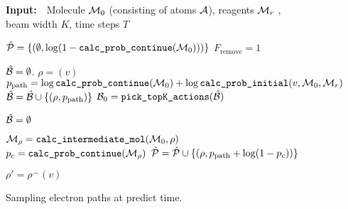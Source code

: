 

\newcommand{\cProbCont}{\texttt{calc\_prob\_continue}}
\newcommand{\cProbAct}{\texttt{calc\_prob\_action}}
\newcommand{\cProbInitial}{\texttt{calc\_prob\_initial}}
\newcommand{\removeFlag}{F_\textrm{remove}}

\newcommand{\outputPool}{\hat{\Pc}}
\newcommand{\cPath}{\rho}
\newcommand{\lProb}{p_{\textrm{path}}}


\begin{figure}
\begin{minipage}{1.\textwidth}
\begin{algorithm}[H]
  \caption{Sampling electron paths at predict time.}
  {\bf Input:}~~Molecule ${\mathcal{M}}_0$ (consisting of atoms ${\mathcal{A}}$), reagents ${\mathcal{M}}_r$ , beam width $K$, time steps $T$
  
  \begin{algorithmic}[1]
  	\STATE $\outputPool = \{\left( \emptyset, \log (1 - \cProbCont(\Mc_0)) \right) \}$  
  	\STATE $\removeFlag \!=\!1$ 
  	
  	\STATE
	\STATE $\hat{{\mathcal{B}}} = \emptyset$.  	
		\STATE $ \cPath = (v)$
		\STATE $ \lProb = \log \cProbCont(\Mc_0) + \log \cProbInitial(v, \moleculeSet_0, \moleculeSet_r)$
		\STATE $\hat{\Bc} = \hat{\Bc} \cup \{\left(\cPath, \lProb \right)\}$
	\ENDFOR
	\STATE  ${\mathcal{B}}_{0} = \texttt{pick\_topK\_actions}(\hat{{\mathcal{B}}})$ 
	
	\STATE
		\STATE $\hat{{\mathcal{B}}} = \emptyset $ 
				
		\FORALL{$(\cPath, \lProb) \in \Bc_{t-1}$} 
			
			\STATE $\Mc_\cPath = \texttt{calc\_intermediate\_mol}(\Mc_0, \cPath)$
			\STATE $p_c = \cProbCont(\Mc_\cPath)$
			\STATE $\hat{\Pc} = \hat{\Pc} \cup \{(\cPath, \lProb + \log (1 - p_c))\}$
			
				\STATE $\cPath' = \cPath^\frown (v)$ 


\end{algorithmic}
\end{algorithm}
\end{minipage}
\end{figure}
